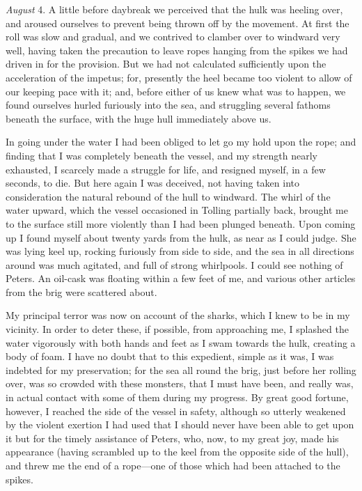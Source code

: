\emph{August} 4. A little before daybreak we perceived that the hulk was
heeling over, and aroused ourselves to prevent being thrown off by the movement.
At first the roll was slow and gradual, and we contrived to clamber over to
windward very well, having taken the precaution to leave ropes hanging from the
spikes we had driven in for the provision. But we had not calculated
sufficiently upon the acceleration of the impetus; for, presently the heel
became too violent to allow of our keeping pace with it; and, before either of
us knew what was to happen, we found ourselves hurled furiously into the sea,
and struggling several fathoms beneath the surface, with the huge hull
immediately above us. 

In going under the water I had been obliged to let go my hold upon the rope;
and finding that I was completely beneath the vessel, and my strength nearly
exhausted, I scarcely made a struggle for life, and resigned myself, in a few
seconds, to die. But here again I was deceived, not having taken into
consideration the natural rebound of the hull to windward. The whirl of the
water upward, which the vessel occasioned in Tolling partially back, brought me
to the surface still more violently than I had been plunged beneath. Upon coming
up I found myself about twenty yards from the hulk, as near as I could judge.
She was lying keel up, rocking furiously from side to side, and the sea in all
directions around was much agitated, and full of strong whirlpools. I could see
nothing of Peters. An oil-cask was floating within a few feet of me, and various
other articles from the brig were scattered about. 

My principal terror was now on account of the sharks, which I knew to be in
my vicinity. In order to deter these, if possible, from approaching me, I
splashed the water vigorously with both hands and feet as I swam towards the
hulk, creating a body of foam. I have no doubt that to this expedient, simple as
it was, I was indebted for my preservation; for the sea all round the brig, just
before her rolling over, was so crowded with these monsters, that I must have
been, and really was, in actual contact with some of them during my progress. By
great good fortune, however, I reached the side of the vessel in safety,
although so utterly weakened by the violent exertion I had used that I should
never have been able to get upon it but for the timely assistance of Peters,
who, now, to my great joy, made his appearance (having scrambled up to the keel
from the opposite side of the hull), and threw me the end of a rope---one of
those which had been attached to the spikes. 

